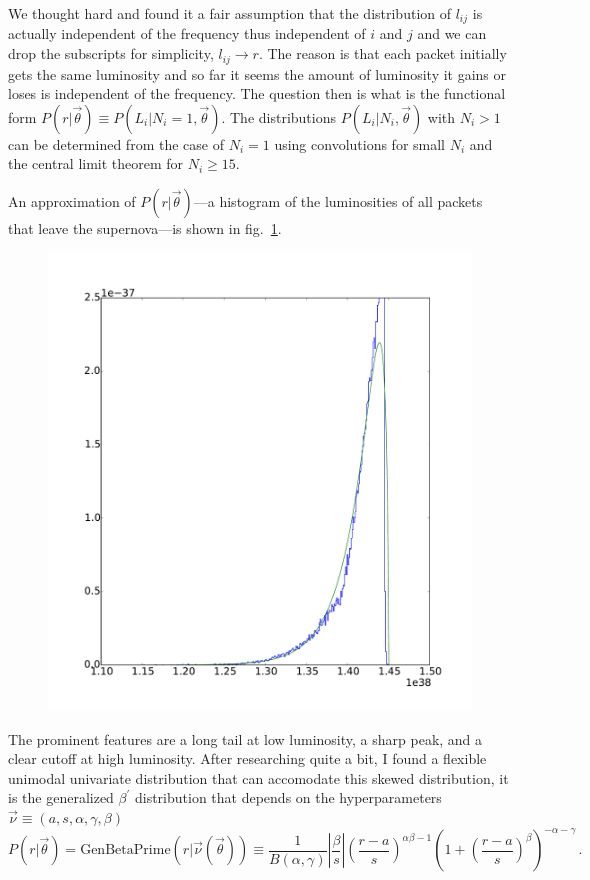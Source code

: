 \documentclass[a4,12pt]{article}
\newcommand{\betap}{\ensuremath{\beta^\prime}}
\newcommand{\genbetapr}{\ensuremath{\mathrm{GenBetaPrime}}}
\newcommand{\Lumi}{\ensuremath{L_i}}
\newcommand{\vecnu}{\ensuremath{\vec{\nu}}}
\newcommand{\vecth}{\ensuremath{{\vec{\theta}}}}
\def \reffig#1{fig.~\ref{fig:#1}}
\begin{document}
We thought hard and found it a fair assumption that the distribution
of $l_{ij}$ is actually independent of the frequency thus independent
of $i$ and $j$ and we can drop the subscripts for simplicity, $l_{ij}
\to r$. The reason is that each packet initially gets the same
luminosity and so far it seems the amount of luminosity it gains or
loses is independent of the frequency. The question then is what is
the functional form $P(r | \vecth) \equiv P(\Lumi | N_i=1, \vecth)
$. The distributions $P(\Lumi | N_i, \vecth)$ with $N_i > 1$ can be
determined from the case of $N_i=1$ using convolutions for small $N_i$
and the central limit theorem for $N_i \ge 15$.

An approximation of $P(r | \vecth)$---a histogram of the luminosities
of all packets that leave the supernova---is shown in
\reffig{hist}.
\begin{figure}[h]
  \begin{center}
    \includegraphics[width=\textwidth]{fit}
  \end{center}
  \caption{
  }
  \label{fig:hist}
\end{figure}
The prominent features are a long tail at low luminosity, a sharp
peak, and a clear cutoff at high luminosity.  After researching quite
a bit, I found a flexible unimodal univariate distribution that can
accomodate this skewed distribution, it is the generalized \betap{}
distribution that depends on the hyperparameters $\vecnu \equiv (a, s,
\alpha, \gamma, \beta)$
\begin{equation}
  \label{eq:betaprime}
  P(r | \vecth) = \genbetapr(r | \vecnu(\vecth)) \equiv \frac{1}{B(\alpha, \gamma)} \left|\frac{\beta}{s} \right| \left( \frac{r - a}{s} \right)^{\alpha \beta - 1} \left(1+\left( \frac{r - a}{s} \right)^{\beta} \right)^{-\alpha - \gamma} \,.
\end{equation}
\end{document}
